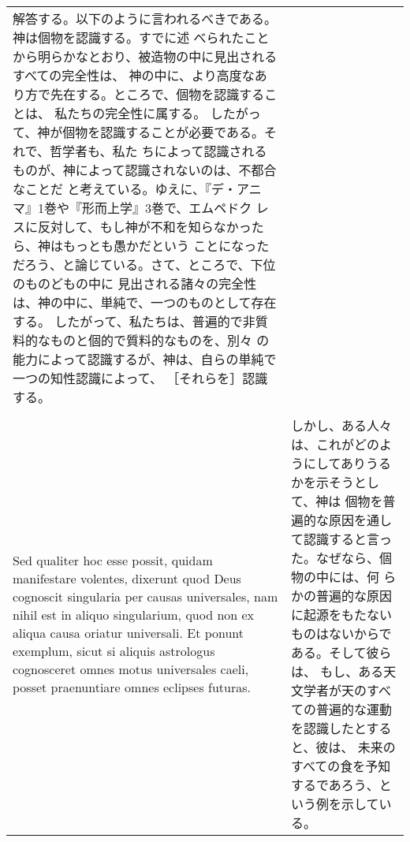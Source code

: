 \documentclass[10pt]{jsarticle} %
\begin{document}
\begin{longtable}{p{21em}p{21em}}
解答する。以下のように言われるべきである。神は個物を認識する。すでに述
べられたことから明らかなとおり、被造物の中に見出されるすべての完全性は、
神の中に、より高度なあり方で先在する。ところで、個物を認識することは、
私たちの完全性に属する。
したがって、神が個物を認識することが必要である。それで、哲学者も、私た
ちによって認識されるものが、神によって認識されないのは、不都合なことだ
と考えている。ゆえに、『デ・アニマ』1巻や『形而上学』3巻で、エムペドク
レスに反対して、もし神が不和を知らなかったら、神はもっとも愚かだという
ことになっただろう、と論じている。さて、ところで、下位のものどもの中に
見出される諸々の完全性は、神の中に、単純で、一つのものとして存在する。
したがって、私たちは、普遍的で非質料的なものと個的で質料的なものを、別々
の能力によって認識するが、神は、自らの単純で一つの知性認識によって、
［それらを］認識する。

\\
\\


Sed qualiter hoc esse possit, quidam manifestare volentes, dixerunt
quod Deus cognoscit singularia per causas universales, nam nihil est
in aliquo singularium, quod non ex aliqua causa oriatur universali. Et
ponunt exemplum, sicut si aliquis astrologus cognosceret omnes motus
universales caeli, posset praenuntiare omnes eclipses futuras.

&

しかし、ある人々は、これがどのようにしてありうるかを示そうとして、神は
個物を普遍的な原因を通して認識すると言った。なぜなら、個物の中には、何
らかの普遍的な原因に起源をもたないものはないからである。そして彼らは、
もし、ある天文学者が天のすべての普遍的な運動を認識したとすると、彼は、
未来のすべての食を予知するであろう、という例を示している。


\end{longtable}
\end{document}
